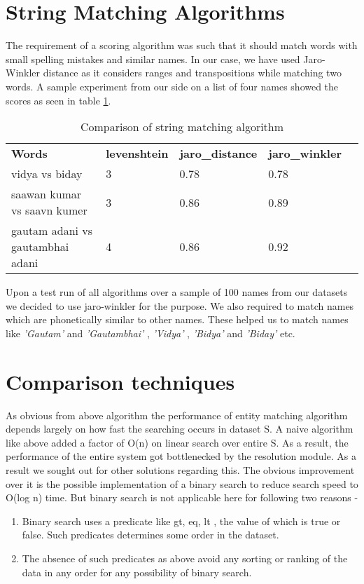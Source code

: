 \section{String Matching Algorithms}
        The requirement of a scoring algorithm was such that it should match words with small spelling mistakes and similar names. In our case, we have used Jaro-Winkler distance as it considers ranges and transpositions while matching two words. A sample experiment from our side on a list of four names showed the scores as seen in table \ref{table:1}.
    \begin{table}[H]
    \centering
    \caption{Comparison of string matching algorithm}
    \label{table:1}
    \begin{tabular}{|l|l|l|l|l}
    \cline{1-4}
    \textbf{Words}                   & \textbf{levenshtein} & \textbf{jaro\_distance} & \textbf{jaro\_winkler} &  \\ \cline{1-4}
    vidya vs biday                   & 3                    & 0.78                    & 0.78                   &  \\ \cline{1-4}
    saawan kumar vs saavn kumer      & 3                    & 0.86                    & 0.89                   &  \\ \cline{1-4}
    gautam adani vs gautambhai adani & 4                    & 0.86                    & 0.92                   &  \\ \cline{1-4}
    \end{tabular}
    \end{table}
        Upon a test run of all algorithms over a sample of 100 names from our datasets we decided to use jaro-winkler for the purpose. We also required to match names which are phonetically similar to other names. These helped us to match names like \textit{ 'Gautam' } and \textit{ 'Gautambhai' }, \textit{ 'Vidya' }, \textit{ 'Bidya' } and \textit{ 'Biday' } etc.

\section{Comparison techniques}
        As obvious from above algorithm the performance of entity matching algorithm depends largely on how fast the searching occurs in dataset S. A naive algorithm like above added a factor of O(n) on linear search over entire S. As a result, the performance of the entire system got bottlenecked by the resolution module. As a result we sought out for other solutions regarding this. The obvious improvement over it is the possible implementation of a binary search to reduce search speed to O(log n) time. But binary search is not applicable here for following two reasons -
            \begin{enumerate}
                \item Binary search uses a predicate like gt, eq, lt , the value of which is true or false. Such predicates determines some order in the dataset. 
                \item The absence of such predicates as above avoid any sorting or ranking of the data in any order for any possibility of binary search.
        
            \end{enumerate}

